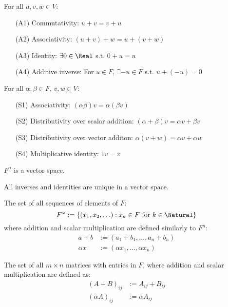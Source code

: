 \begin{definition}
  For all $u, v, w \in V$:
  \begin{itemize}
    \item[(A1)] Commutativity: $u + v = v + u$ 
    \item[(A2)] Associativity: $(u + v) + w = u + (v + w)$
    \item[(A3)] Identity: $\exists 0 \in \Real$ s.t. $0 + u = u$
    \item[(A4)] Additive inverse: For $u \in F$, $\exists -u \in F$ s.t. $u + (-u) = 0$
  \end{itemize}
\end{definition}

\begin{definition}
  For all $\alpha, \beta \in F$, $v, w \in V$:
  \begin{itemize}
    \item[(S1)] Associativity: $(\alpha\beta)v = \alpha(\beta v)$ 
    \item[(S2)] Distributivity over scalar addition: $(\alpha + \beta) v = \alpha v + \beta v$
    \item[(S3)] Distributivity over vector additon: $\alpha(v + w) = \alpha v + \alpha w$
    \item[(S4)] Multiplicative identity: $1v = v$
  \end{itemize}
\end{definition}

\begin{theorem} $F^n$ is a vector space.
\end{theorem}

\begin{theorem} All inverses and identities are unique in a vector space.
\end{theorem}

\begin{definition}[$F^\omega$] The set of all sequences of elements of $F$:
  \[
    F^\omega := \{ (x_1, x_2, \ldots) : x_k \in F \text{ for } k \in \Natural \}
  \]
  where addition and scalar multiplication are defined similarly to $F^n$:
  \begin{align*}
    a + b &:= (a_1 + b_1, \ldots, a_n + b_n) \\
    \alpha x &:= (\alpha x_1, \ldots, \alpha x_n)
  \end{align*}
\end{definition}

\begin{definition}[$F^{m,n}$] The set of all $m \times n$ matrices with entries in $F$, where addition and scalar multiplication are defined as:
  \begin{align*}
    (A + B)_{ij} &:= A_{ij} + B_{ij} \\
    (\alpha A)_{ij} &:= \alpha A_{ij}
  \end{align*}
\end{definition}

